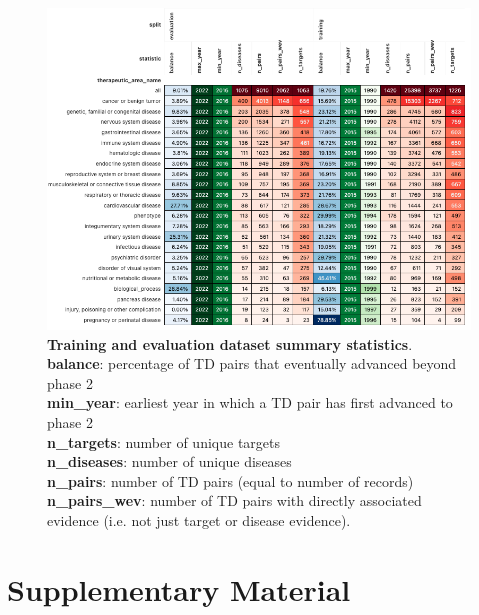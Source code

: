 \documentclass{article}
\begin{document}
\begin{figure}[H]
  \centering
  \captionsetup{width=.9\linewidth}
  \includegraphics[width=1\textwidth]{dataset_statistics.png}
  \caption{
    \textbf{Training and evaluation dataset summary statistics}.\\\hspace{\textwidth}
    \textbf{balance}: percentage of TD pairs that eventually advanced beyond phase 2 \\\hspace{\textwidth} 
    \textbf{min\_year}: earliest year in which a TD pair has first advanced to phase 2 \\\hspace{\textwidth} 
    \textbf{n\_targets}: number of unique targets \\\hspace{\textwidth} 
    \textbf{n\_diseases}: number of unique diseases \\\hspace{\textwidth} 
    \textbf{n\_pairs}: number of TD pairs (equal to number of records) \\\hspace{\textwidth} 
    \textbf{n\_pairs\_wev}: number of TD pairs with directly associated evidence (i.e. not just target or disease evidence).
  }
  \label{fig:dataset_statistics}
\end{figure}

\pagebreak



\clearpage

\section{Supplementary Material}
\end{document}
